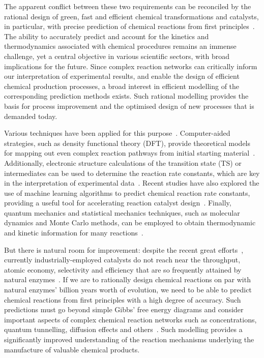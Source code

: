The apparent conflict between these two requirements can be reconciled by
the rational design of green,
fast and efficient chemical transformations and catalysts,
in particular, with precise prediction of chemical reactions from first principles~\cite{Kitchin_2012}.
The ability to accurately predict and account for the kinetics and thermodynamics associated
with chemical procedures remains an immense challenge,
yet a central objective in various scientific sectors,
with broad implications for the future.
Since complex reaction networks can critically inform our interpretation of experimental results,
and enable the design of efficient chemical production processes,
a broad interest in efficient modelling of the corresponding prediction methods exists.
Such rational modelling provides the basis for process improvement and the optimised design of new processes
that is demanded today.

Various techniques have been applied for this purpose~\cite{Houk_2014,Chew_2020,Chin_2022,Cao2022}.
Computer-aided strategies,
such as density functional theory (DFT),
provide theoretical models for mapping out even complex reaction pathways from initial starting material~\cite{Maeda_2011,Simm_2017,Rappoport_2019}.
Additionally,
electronic structure calculations of the transition state (TS) or intermediates can be used to determine the reaction rate constants,
which are key in the interpretation of experimental data~\cite{Plata_2015,Santoro_2016,Coelho_2019,Oliveira_2020}.
Recent studies have also explored the use of machine learning algorithms
to predict chemical reaction rate constants,
providing a useful tool for
accelerating reaction catalyst design~\cite{Komp_2022,Tu_2022}.
Finally,
quantum mechanics and statistical mechanics techniques,
such as molecular dynamics and Monte Carlo methods,
can be employed to obtain thermodynamic and kinetic information for many reactions~\cite{Wang_2014}.

But there is natural room for improvement:
despite the recent great efforts~\cite{Peng_2016},
currently industrially-employed catalysts do
not reach near the throughput,
atomic economy,
selectivity and efficiency that
are so frequently attained by natural
enzymes~\cite{Catalysis_in_Chemistry_and_Enzymology}.
If we are to rationally design chemical reactions on par with natural enzymes' billion years worth of evolution,
we need to be able to predict chemical reactions from first principles with a
high degree of accuracy.
Such predictions must go beyond simple Gibbs' free energy
diagrams and consider important aspects of complex chemical reaction networks
such as concentrations,
quantum tunnelling,
diffusion effects and others~\cite{Besora_2018}.
Such modelling provides a significantly improved understanding of the reaction mechanisms underlying the manufacture of valuable chemical products.

